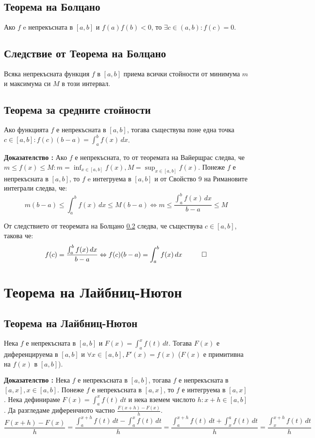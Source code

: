 \documentclass[fleqn,12pt]{article}
\begin{document}
\subsection{Теорема на Болцано}
Ако $f$ e непрекъсната в $[a,b]$ и $f(a)f(b)<0$, то $\exists c \in (a,b): f(c) = 0$.

\subsection{Следствие от Теорема на Болцано} \label{boltzano:extra}
Всяка непрекъсната функция $f$ в $[a,b]$ приема всички стойности от минимума $m$ и максимума си $M$ в този интервал.

\subsection{Теорема за средните стойности}
Ако функцията $f$ е непрекъсната в $[a,b]$, тогава съществува поне една точка $c \in [a,b]: f(c)(b-a) = \int_{a}^{b}  f(x)\,dx$.

\textbf{Доказателство :} Ако $f$ е непрекъсната, то от теоремата на Вайерщрас следва, че $m \leq f(x) \leq M: m = \inf_{x \in [a,b]}f(x), M = \sup_{x \in [a,b]}f(x)$.
Понеже $f$ е непрекъсната в $[a,b]$, то $f$ e интегруема в $[a,b]$ и от Свойство 9 на Римановите интеграли следва, че:
\[ m(b-a) \leq \int_{a}^{b}  f(x)\,dx \leq M(b-a) \Leftrightarrow m \leq \frac{\int_{a}^{b} f(x)\,dx}{b-a} \leq M \] 

От следствието от теоремата на Болцано \ref{boltzano:extra} следва, че съществува $c \in [a,b]$, такова че: 
\[ f(c) = \frac{\int_{a}^{b} f(x)\,dx}{b-a} \Leftrightarrow f(c)(b-a) = \int_{a}^{b}  f(x)\,dx \hspace{10mm} \square \]

\section{Теорема на Лайбниц-Нютон}
\subsection{Теорема на Лайбниц-Нютон}
Нека $f$ е непрекъсната в $[a,b]$ и $F(x)=\int_{a}^{x} f(t)\,dt$. Тогава $F(x)$ е диференцируема в $[a,b]$ и $\forall x \in [a,b], F'(x)=f(x)$ ($F(x)$ е примитивна на $f(x)$ в $[a,b]$).

\textbf{Доказателство :} Нека $f$ е непрекъсната в $[a,b]$, тогава $f$ е непрекъсната в $[a,x], x \in [a,b]$. Понеже  $f$ е непрекъсната в $[a,x]$, то $f$ е интегруема в $[a,x]$.
Нека дефинираме $F(x)=\int_{a}^{x} f(t)\,dt$ и нека вземем числото $h: x+h\in[a,b]$. Да разгледаме диференчното частно $\frac{F(x+h)-F(x)}{h}$.
\[\frac{F(x+h)-F(x)}{h} = \frac{\int_{a}^{x+h} f(t)\,dt - \int_{a}^{x} f(t)\,dt}{h} = \frac{\int_{a}^{x+h} f(t)\,dt + \int_{x}^{a} f(t)\,dt}{h} = \frac{\int_{x}^{x+h} f(t)\,dt}{h} \]
\end{document}

